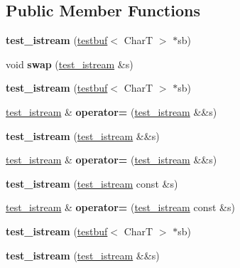 \subsection*{Public Member Functions}
\begin{DoxyCompactItemize}
\item 
\mbox{\label{structtest__istream_a6eab19bfcc5a3031f1944f3898cf5f9d}} 
{\bfseries test\+\_\+istream} (\mbox{\hyperlink{structtestbuf}{testbuf}}$<$ CharT $>$ $\ast$sb)
\item 
\mbox{\label{structtest__istream_acebb2d6bf97ca978583f74d8bc2643c2}} 
void {\bfseries swap} (\mbox{\hyperlink{structtest__istream}{test\+\_\+istream}} \&s)
\item 
\mbox{\label{structtest__istream_a6eab19bfcc5a3031f1944f3898cf5f9d}} 
{\bfseries test\+\_\+istream} (\mbox{\hyperlink{structtestbuf}{testbuf}}$<$ CharT $>$ $\ast$sb)
\item 
\mbox{\label{structtest__istream_a14ce073c386e56b606572433a83458c3}} 
\mbox{\hyperlink{structtest__istream}{test\+\_\+istream}} \& {\bfseries operator=} (\mbox{\hyperlink{structtest__istream}{test\+\_\+istream}} \&\&s)
\item 
\mbox{\label{structtest__istream_a76685904f05b5010c20d897003c5dd81}} 
{\bfseries test\+\_\+istream} (\mbox{\hyperlink{structtest__istream}{test\+\_\+istream}} \&\&s)
\item 
\mbox{\label{structtest__istream_a14ce073c386e56b606572433a83458c3}} 
\mbox{\hyperlink{structtest__istream}{test\+\_\+istream}} \& {\bfseries operator=} (\mbox{\hyperlink{structtest__istream}{test\+\_\+istream}} \&\&s)
\item 
\mbox{\label{structtest__istream_a6eab6a9a30b6383a2812fe6404da9e1f}} 
{\bfseries test\+\_\+istream} (\mbox{\hyperlink{structtest__istream}{test\+\_\+istream}} const \&s)
\item 
\mbox{\label{structtest__istream_a99acc65e411e892f0a63eb67b2624dc7}} 
\mbox{\hyperlink{structtest__istream}{test\+\_\+istream}} \& {\bfseries operator=} (\mbox{\hyperlink{structtest__istream}{test\+\_\+istream}} const \&s)
\item 
\mbox{\label{structtest__istream_a6eab19bfcc5a3031f1944f3898cf5f9d}} 
{\bfseries test\+\_\+istream} (\mbox{\hyperlink{structtestbuf}{testbuf}}$<$ CharT $>$ $\ast$sb)
\item 
\mbox{\label{structtest__istream_a76685904f05b5010c20d897003c5dd81}} 
{\bfseries test\+\_\+istream} (\mbox{\hyperlink{structtest__istream}{test\+\_\+istream}} \&\&s)
\end{DoxyCompactItemize}


